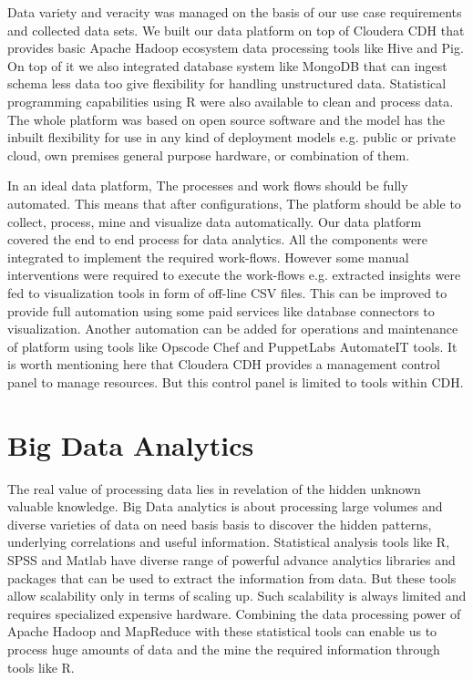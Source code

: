 Data variety and veracity was managed on the basis of our use case requirements and collected data sets. We built our data platform on top of Cloudera CDH that provides basic Apache Hadoop ecosystem data processing tools like Hive and Pig. On top of it we also integrated database system like MongoDB that can ingest schema less data too give flexibility for handling unstructured data. Statistical programming capabilities using R were also available to clean and process data. The whole platform was based on open source software and the model has the inbuilt flexibility for use in any kind of deployment models e.g. public or private cloud, own premises general purpose hardware, or combination of them. 

In an ideal data platform, The processes and work flows should be fully automated. This means that after configurations, The platform should be able to collect, process, mine and visualize data automatically. Our data platform covered the end to end process for data analytics. All the components were integrated to implement the required work-flows. However some manual interventions were required to execute the work-flows e.g. extracted insights were fed to visualization tools in form of off-line CSV files. This can be improved to provide full automation using some paid services like database connectors to visualization. Another automation can be added for operations and maintenance of platform using tools like Opscode Chef and PuppetLabs AutomateIT tools. It is worth mentioning here that Cloudera CDH provides a management control panel to manage resources. But this control panel is limited to tools within CDH. 
\section{Big Data Analytics}
The real value of processing data lies in revelation of  the hidden unknown valuable knowledge. Big Data analytics is about processing large volumes and diverse varieties of data on need basis basis to discover the hidden patterns, underlying correlations and useful information. Statistical analysis tools like R, SPSS and Matlab have diverse range of powerful advance analytics libraries and packages that can be used to extract the information from data. But these tools allow scalability only in terms of scaling up. Such scalability is always limited and requires specialized expensive hardware. Combining the data processing power of Apache Hadoop and MapReduce with these statistical tools can enable us to process huge amounts of data and the mine the required information through tools like R.

